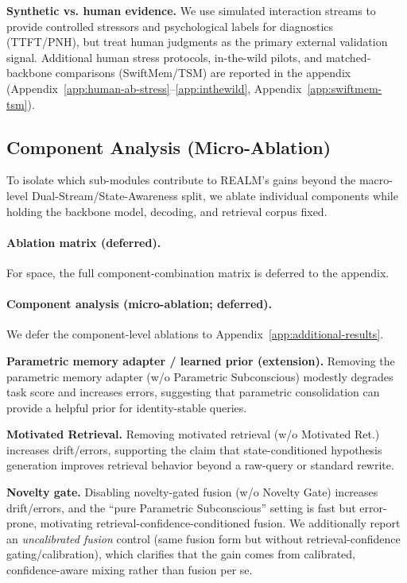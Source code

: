 \documentclass{article}
\begin{document}
\textbf{Synthetic vs. human evidence.}
We use simulated interaction streams to provide controlled stressors and psychological labels for diagnostics (TTFT/PNH), but treat human judgments as the primary external validation signal.
Additional human stress protocols, in-the-wild pilots, and matched-backbone comparisons (SwiftMem/TSM) are reported in the appendix (Appendix~\ref{app:human-ab-stress}--\ref{app:inthewild}, Appendix~\ref{app:swiftmem-tsm}).

\subsection{Component Analysis (Micro-Ablation)}
\label{sec:micro-ablation}
To isolate which sub-modules contribute to REALM's gains beyond the macro-level Dual-Stream/State-Awareness split, we ablate individual components while holding the backbone model, decoding, and retrieval corpus fixed.

\paragraph{Ablation matrix (deferred).}
For space, the full component-combination matrix is deferred to the appendix.

\paragraph{Component analysis (micro-ablation; deferred).}
We defer the component-level ablations to Appendix~\ref{app:additional-results}.

\textbf{Parametric memory adapter / learned prior (extension).}
Removing the parametric memory adapter (w/o Parametric Subconscious) modestly degrades task score and increases errors, suggesting that parametric consolidation can provide a helpful prior for identity-stable queries.

\textbf{Motivated Retrieval.}
Removing motivated retrieval (w/o Motivated Ret.) increases drift/errors, supporting the claim that state-conditioned hypothesis generation improves retrieval behavior beyond a raw-query or standard rewrite.

\textbf{Novelty gate.}
Disabling novelty-gated fusion (w/o Novelty Gate) increases drift/errors, and the ``pure Parametric Subconscious'' setting is fast but error-prone, motivating retrieval-confidence-conditioned fusion.
We additionally report an \emph{uncalibrated fusion} control (same fusion form but without retrieval-confidence gating/calibration), which clarifies that the gain comes from calibrated, confidence-aware mixing rather than fusion per se.
\end{document}
